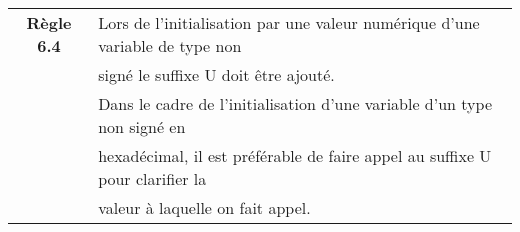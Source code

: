 \medskip

\begin{center}
\begin{tabular}{|c l|}
\hline
\rowcolor{red!10}\textbf{Règle 6.4} & Lors de l'initialisation par une valeur numérique d'une variable de type non \\
\rowcolor{red!10} & signé le suffixe U doit être ajouté.\\ \hline
 & Dans le cadre de l’initialisation d’une variable d’un type non signé en \\
 & hexadécimal, il est préférable de faire appel au suffixe U pour clarifier la \\
 & valeur à laquelle on fait appel.\\ \hline
\hline
\end{tabular}
\end{center}

\medskip

\pagebreak